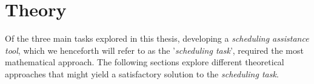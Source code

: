 \section{Theory}
Of the three main tasks explored in this thesis, developing a \textit{scheduling assistance tool}, which we henceforth will refer to as the '\textit{scheduling task}', required the most mathematical approach. 
The following sections explore different theoretical approaches that might yield a satisfactory solution to the \textit{scheduling task}.





